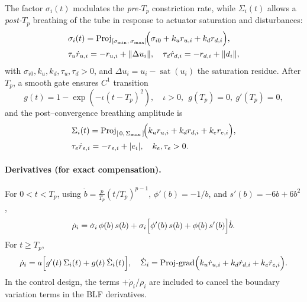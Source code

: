 \documentclass[pdflatex,sn-mathphys-num]{sn-jnl}%
\theoremstyle{thmstyleone}%
\theoremstyle{thmstyletwo}%
\theoremstyle{thmstylethree}%
\begin{document}
The factor $\sigma_i(t)$ modulates the \emph{pre-$T_p$} constriction rate, while $\Sigma_i(t)$ allows a \emph{post-$T_p$} breathing of the tube in response to actuator saturation and disturbances:
\begin{align}
&\sigma_i(t)=\operatorname{Proj}_{[\sigma_{\min},\,\sigma_{\max}]}\!\Bigl(\sigma_{i0}+k_u r_{u,i}+k_d r_{d,i}\Bigr),\label{eq:gppf-sigma}\\
&\tau_u \dot r_{u,i}=-r_{u,i}+\|\Delta u_i\|,\quad
  \tau_d \dot r_{d,i}=-r_{d,i}+\|d_i\|, \nonumber
\end{align}
with $\sigma_{i0},k_u,k_d,\tau_u,\tau_d>0$, and $\Delta u_i=u_i-\operatorname{sat}(u_i)$ the saturation residue.
After $T_p$, a smooth gate ensures $C^1$ transition
\begin{equation}\label{eq:gppf-gate}
g(t)=1-\exp\!\left(-\iota (t-T_p)^2\right),\quad \iota>0,\ \ g(T_p)=0,\ g'(T_p)=0,
\end{equation}      
and the post–convergence breathing amplitude is
\begin{align}
&\Sigma_i(t)=\operatorname{Proj}_{[\,0,\,\Sigma_{\max}\,]}\!\Bigl(k_u r_{u,i}+k_d r_{d,i}+k_e r_{e,i}\Bigr),\label{eq:gppf-Sigma}\\
&\tau_e \dot r_{e,i}=-r_{e,i}+|e_i|, \quad k_e,\tau_e>0.\nonumber
\end{align}

\paragraph{Derivatives (for exact compensation).}
For $0<t<T_p$, using $\dot b=\frac{p}{T_p}(t/T_p)^{p-1}$, $\phi'(b)=-1/b$, and $s'(b)=-6b+6b^2$,
\begin{equation}\label{eq:gppf-drho-pre}
\dot\rho_i
= \dot\sigma_i\,\phi(b)\,s(b)
+ \sigma_i\Bigl[\phi'(b)\,s(b)+\phi(b)\,s'(b)\Bigr]\dot b .
\end{equation}
For $t\ge T_p$,
\begin{equation}\label{eq:gppf-drho-post}
\dot\rho_i
= a\Bigl[g'(t)\,\Sigma_i(t)+g(t)\,\dot\Sigma_i(t)\Bigr],\quad
\dot\Sigma_i=\text{Proj-grad}\Bigl(k_u\dot r_{u,i}+k_d\dot r_{d,i}+k_e\dot r_{e,i}\Bigr).
\end{equation}
In the control design, the terms $+\dot\rho_i/\rho_i$ are included to cancel the boundary variation terms in the BLF derivatives.
\end{document}
